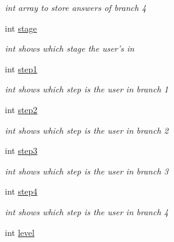 \begin{DoxyCompactItemize}
\begin{DoxyCompactList}\small\item\em int array to store answers of branch 4 \end{DoxyCompactList}\item 
\hypertarget{classgamemanager3_a371e00182107aca2db0c7a92ea8bc404}{int \hyperlink{classgamemanager3_a371e00182107aca2db0c7a92ea8bc404}{stage}}\label{classgamemanager3_a371e00182107aca2db0c7a92ea8bc404}

\begin{DoxyCompactList}\small\item\em int shows which stage the user's in \end{DoxyCompactList}\item 
\hypertarget{classgamemanager3_a66fa9846113fba881fa12d52aaea86e7}{int \hyperlink{classgamemanager3_a66fa9846113fba881fa12d52aaea86e7}{step1}}\label{classgamemanager3_a66fa9846113fba881fa12d52aaea86e7}

\begin{DoxyCompactList}\small\item\em int shows which step is the user in branch 1 \end{DoxyCompactList}\item 
\hypertarget{classgamemanager3_ae3a41d71066f22542d876dff5143ad12}{int \hyperlink{classgamemanager3_ae3a41d71066f22542d876dff5143ad12}{step2}}\label{classgamemanager3_ae3a41d71066f22542d876dff5143ad12}

\begin{DoxyCompactList}\small\item\em int shows which step is the user in branch 2 \end{DoxyCompactList}\item 
\hypertarget{classgamemanager3_a48a4b480f488bafb4e03a8e66abb2f3c}{int \hyperlink{classgamemanager3_a48a4b480f488bafb4e03a8e66abb2f3c}{step3}}\label{classgamemanager3_a48a4b480f488bafb4e03a8e66abb2f3c}

\begin{DoxyCompactList}\small\item\em int shows which step is the user in branch 3 \end{DoxyCompactList}\item 
\hypertarget{classgamemanager3_aabb44e9d1fdac075e99dee0f3e7fde19}{int \hyperlink{classgamemanager3_aabb44e9d1fdac075e99dee0f3e7fde19}{step4}}\label{classgamemanager3_aabb44e9d1fdac075e99dee0f3e7fde19}

\begin{DoxyCompactList}\small\item\em int shows which step is the user in branch 4 \end{DoxyCompactList}\item 
\hypertarget{classgamemanager3_a4e1ef9315c59af9184dee4e0de7569ae}{int \hyperlink{classgamemanager3_a4e1ef9315c59af9184dee4e0de7569ae}{level}}\label{classgamemanager3_a4e1ef9315c59af9184dee4e0de7569ae}


\end{DoxyCompactItemize}
